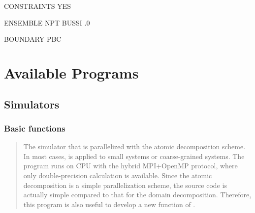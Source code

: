 \documentclass[a4paper,11pt,oneside,english]{sphinxmanual}
\begin{document}
\begin{sphinxVerbatim}[commandchars=\\\{\}]
\PYG{o}{[}CONSTRAINTS\PYG{o}{]}
         YES          

\PYG{o}{[}ENSEMBLE\PYG{o}{]}
           NPT          
          BUSSI        
                  
           .0          

\PYG{o}{[}BOUNDARY\PYG{o}{]}
               PBC          
\end{sphinxVerbatim}


\chapter{Available Programs}
\label{\detokenize{02_Available_Programs:available-programs}}\label{\detokenize{02_Available_Programs:id1}}\label{\detokenize{02_Available_Programs::doc}}

\section{Simulators}
\label{\detokenize{02_Available_Programs:simulators}}

\subsection{Basic functions}
\label{\detokenize{02_Available_Programs:basic-functions}}
\begin{quote}

The simulator that is parallelized with the atomic decomposition scheme.
In most cases,  is applied to small systems or coarse-grained systems.
The program runs on CPU with the hybrid MPI+OpenMP protocol, where
only double-precision calculation is available.
Since the atomic decomposition is a simple parallelization scheme,
the source code is actually simple compared to that for the domain decomposition.
Therefore, this program is also useful to develop a new function of .
\end{quote}
\end{document}

